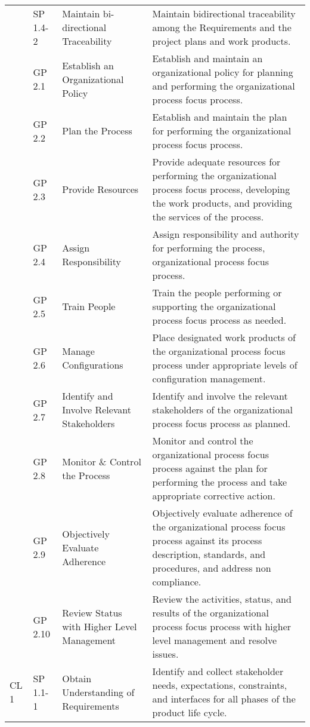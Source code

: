 \begin{center}
\begin{longtable}{|p{2cm}|p{2cm}|p{2.5cm}|p{5cm}|}
& SP 1.4-2 & Maintain bi-directional Traceability & Maintain bidirectional traceability among the Requirements and the project plans and work products.\\ \cline{2-4}
& GP 2.1 & Establish an Organizational Policy & Establish and maintain an organizational policy for planning and performing the organizational process focus process.\\ \cline{2-4}
& GP 2.2 & Plan the Process & Establish and maintain the plan for performing the organizational process focus process.\\ \cline{2-4}
& GP 2.3 & Provide Resources & Provide adequate resources for performing the organizational process focus process, developing the work products, and  providing the services of the process.\\ \cline{2-4}
& GP 2.4 & Assign Responsibility & Assign responsibility and authority for performing the process, organizational process focus process.\\ \cline{2-4}
& GP 2.5 & Train People & Train the people performing or supporting the organizational process focus process as needed.\\ \cline{2-4}
& GP 2.6 & Manage Configurations & Place designated work products of the organizational process  focus process under appropriate levels of configuration management.\\ \cline{2-4}
& GP 2.7 & Identify and Involve Relevant Stakeholders & Identify and involve the relevant stakeholders of the organizational process focus process as planned.\\ \cline{2-4}
& GP 2.8 & Monitor \& Control the Process & Monitor and control the organizational process focus process against the plan for performing the process and take appropriate corrective action.\\ \cline{2-4}
& GP 2.9 & Objectively Evaluate Adherence & Objectively evaluate adherence of the organizational process focus process against its process description, standards, and procedures, and address non compliance.\\ \cline{2-4}
& GP 2.10 & Review Status with Higher Level Management & Review the activities, status, and results of the organizational process focus process with higher level management and resolve issues.\\ \cline{2-4} \hline
\multirow{4}{*}{CL 1} & SP 1.1-1 & Obtain Understanding of Requirements & Identify and collect stakeholder needs, expectations, constraints, and interfaces for all phases of the product life cycle.\\ \cline{2-4}

\end{longtable}
\end{center}
